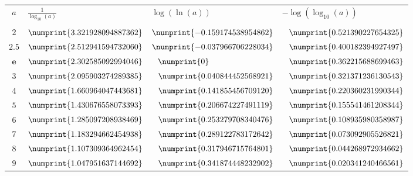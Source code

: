 \documentclass[a4paper, twoside]{article}
\begin{document}
	\vspace{0.2cm}

	\begin{center}
	\begin{large}
	\begin{tabular}{c||l||l|l}

	\Large $a$ & \LARGE \hfil $ \frac{1}{\log_{10}(a)} $ \hfill & \Large \hfil $\log(\ln(a))$ \hfill & \Large \hfil  $- \log(\log_{10}(a))$ \hfill \\

	&&&\\

	$2$ & $\numprint{3.321928094887362}$ & $ \numprint{-0.159174538954862}$ & $ \phantom{-}\numprint{0.521390227654325} $\\

	$2.5$ & $\numprint{2.512941594732060}$ & $ \numprint{-0.037966706228034}$ & $ \phantom{-}\numprint{0.400182394927497} $\\

	$\mathbf{e}$ & $\numprint{2.302585092994046}$ & $ \phantom{-}\numprint{0}$ & $ \phantom{-}\numprint{0.362215688699463} $\\

	$3$ & $\numprint{2.095903274289385}$ & $ \phantom{-}\numprint{0.040844452568921}$ & $ \phantom{-}\numprint{0.321371236130543} $\\

	$4$ & $\numprint{1.660964047443681}$ & $ \phantom{-}\numprint{0.141855456709120}$ & $ \phantom{-}\numprint{0.220360231990344} $\\

	$5$ & $\numprint{1.430676558073393}$ & $ \phantom{-}\numprint{0.206674227491119}$ & $ \phantom{-}\numprint{0.155541461208344} $\\

	$6$ & $\numprint{1.285097208938469}$ & $ \phantom{-}\numprint{0.253279708340476}$ & $ \phantom{-}\numprint{0.108935980358987} $\\

	$7$ & $\numprint{1.183294662454938}$ & $ \phantom{-}\numprint{0.289122783172642}$ & $ \phantom{-}\numprint{0.073092905526821} $\\

	$8$ & $\numprint{1.107309364962454}$ & $ \phantom{-}\numprint{0.317946715764801}$ & $ \phantom{-}\numprint{0.044268972934662} $\\

	$9$ & $\numprint{1.047951637144692}$ & $ \phantom{-}\numprint{0.341874448232902}$ & $ \phantom{-}\numprint{0.020341240466561} $\\


\end{tabular}
\end{large}
\end{center}
\end{document}
